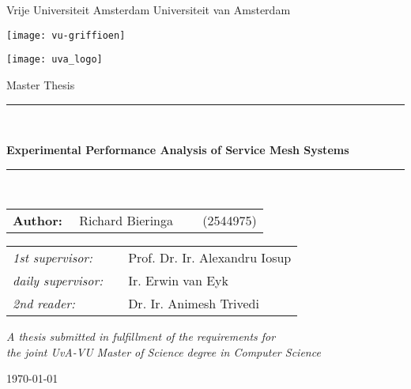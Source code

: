 \thispagestyle{empty}

\begin{center}
Vrije Universiteit Amsterdam \hspace*{2cm} Universiteit van Amsterdam

\vspace{1mm}

\hspace*{-7.5cm}\texttt{[image: vu-griffioen]}

\vspace*{-2cm}\hspace*{7.5cm}\texttt{[image: uva\_logo]}

\vspace{2cm}

{\Large Master Thesis}

\vspace*{1.5cm}

\rule{.9\linewidth}{.6pt}\\[0.4cm]
{\huge \bfseries 
    Experimental Performance Analysis of Service Mesh Systems
\par}\vspace{0.4cm}
\rule{.9\linewidth}{.6pt}\\[1.5cm]

\vspace*{2mm}

{\Large
\begin{tabular}{l}
{\bf Author:} ~~Richard Bieringa~~~~ (2544975)
\end{tabular}
}

\vspace*{1cm}

\begin{tabular}{ll}
{\it 1st supervisor:}   & ~~Prof. Dr. Ir. Alexandru Iosup \\
{\it daily supervisor:} & ~~Ir. Erwin van Eyk \\
{\it 2nd reader:}       & ~~Dr. Ir. Animesh Trivedi
\end{tabular}

\vspace*{1cm}

\textit{A thesis submitted in fulfillment of the requirements for\\ the joint UvA-VU Master of Science degree in Computer Science}

\vspace*{1.8cm}

\today\\[4cm] %

\end{center}